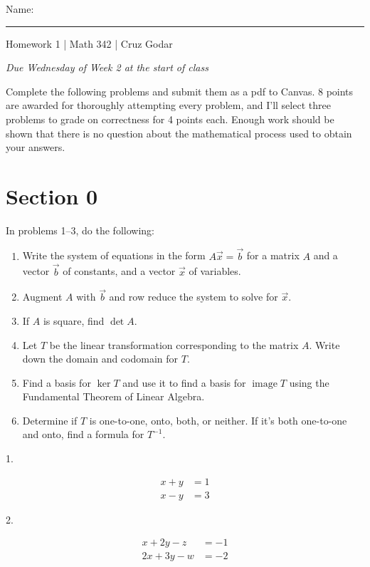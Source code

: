\documentclass{article}
\begin{document}
\Large Name: \rule{2in}{0.15mm} \hfill Homework 1 | Math 342 | Cruz Godar \vspace{4pt}  \normalsize

\textit{Due Wednesday of Week 2 at the start of class}

Complete the following problems and submit them as a pdf to Canvas. 8 points are awarded for thoroughly attempting every problem, and I'll select three problems to grade on correctness for 4 points each. Enough work should be shown that there is no question about the mathematical process used to obtain your answers.

\section{Section 0}

In problems 1--3, do the following:

\begin{enumerate}

	\item Write the system of equations in the form $A\vec{x} = \vec{b}$ for a matrix $A$ and a vector $\vec{b}$ of constants, and a vector $\vec{x}$ of variables.

	\item Augment $A$ with $\vec{b}$ and row reduce the system to solve for $\vec{x}$.

	\item If $A$ is square, find $\det A$.

	\item Let $T$ be the linear transformation corresponding to the matrix $A$. Write down the domain and codomain for $T$.

	\item Find a basis for $\ker T$ and use it to find a basis for $\operatorname{image} T$ using the Fundamental Theorem of Linear Algebra.

	\item Determine if $T$ is one-to-one, onto, both, or neither. If it's both one-to-one and onto, find a formula for $T^{-1}$.

\end{enumerate}

1.

\begin{align*}
	x + y &= 1\\
	x - y &= 3
\end{align*}

2.

\begin{align*}
	x + 2y - z &= -1\\
	2x + 3y - w &= -2
\end{align*}
\end{document}
